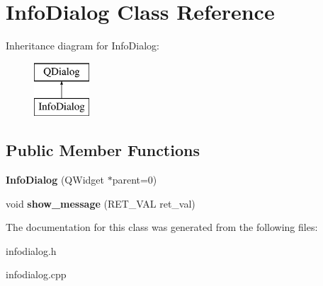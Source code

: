 \hypertarget{classInfoDialog}{\section{Info\-Dialog Class Reference}
\label{classInfoDialog}
}
Inheritance diagram for Info\-Dialog\-:\begin{figure}[H]
\begin{center}
\leavevmode
\includegraphics[height=2.000000cm]{classInfoDialog}
\end{center}
\end{figure}
\subsection*{Public Member Functions}
\begin{DoxyCompactItemize}
\item 
\hypertarget{classInfoDialog_a446583cff8652d633f59db711bad2edc}{{\bfseries Info\-Dialog} (Q\-Widget $\ast$parent=0)}\label{classInfoDialog_a446583cff8652d633f59db711bad2edc}

\item 
\hypertarget{classInfoDialog_aec99044be3072eddb6a84fc8073063fb}{void {\bfseries show\-\_\-message} (R\-E\-T\-\_\-\-V\-A\-L ret\-\_\-val)}\label{classInfoDialog_aec99044be3072eddb6a84fc8073063fb}

\end{DoxyCompactItemize}


The documentation for this class was generated from the following files\-:\begin{DoxyCompactItemize}
\item 
infodialog.\-h\item 
infodialog.\-cpp\end{DoxyCompactItemize}
